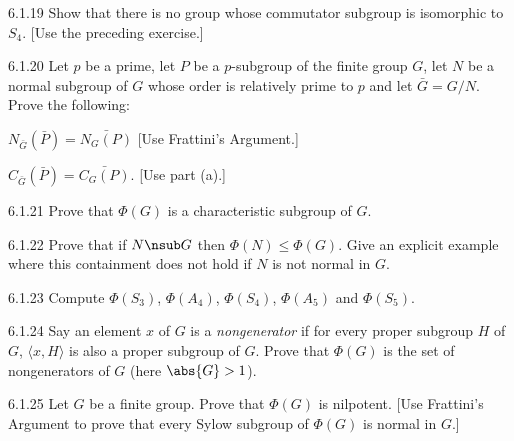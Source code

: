 \begin{exercise}{6.1.19}
    Show that there is no group whose commutator subgroup is isomorphic to $S_4$.
    [Use the preceding exercise.]
\end{exercise}

\begin{exercise}{6.1.20}
    Let $p$ be a prime, let $P$ be a $p$-subgroup of the finite group $G$, let $N$ be a normal subgroup of $G$ whose order is relatively prime to $p$ and let $\bar{G} = G/N$.
    Prove the following:
    \begin{subexercises}
        \item $N_{\bar{G}}(\bar{P}) = \bar{N_G(P)}$ [Use Frattini's Argument.]
        \item $C_{\bar{G}}(\bar{P}) = \bar{C_G(P)}$. [Use part (a).]
    \end{subexercises}
\end{exercise}

\begin{exercise}{6.1.21}
    Prove that $\Phi(G)$ is a characteristic subgroup of $G$.
\end{exercise}

\begin{exercise}{6.1.22}
    Prove that if $N \nsub G$ then $\Phi(N) \leq \Phi(G)$.
    Give an explicit example where this containment does not hold if $N$ is not normal in $G$.
\end{exercise}

\begin{exercise}{6.1.23}
    Compute $\Phi(S_3)$, $\Phi(A_4)$, $\Phi(S_4)$, $\Phi(A_5)$ and $\Phi(S_5)$.
\end{exercise}

\begin{exercise}{6.1.24}
    Say an element $x$ of $G$ is a \emph{nongenerator} if for every proper subgroup $H$ of $G$, $\langle x, H \rangle$ is also a proper subgroup of $G$.
    Prove that $\Phi(G)$ is the set of nongenerators of $G$ (here $\abs{G} > 1$).
\end{exercise}

\begin{exercise}{6.1.25}
    Let $G$ be a finite group.
    Prove that $\Phi(G)$ is nilpotent.
    [Use Frattini's Argument to prove that every Sylow subgroup of $\Phi(G)$ is normal in $G$.]
\end{exercise}

